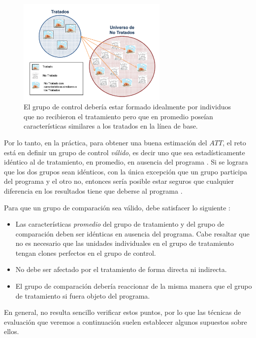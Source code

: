 \documentclass[../../main.tex]{subfiles}
\begin{document}
\begin{figure}[h!]
    \centering
    \includegraphics[width=0.65\textwidth]{figs/grupo-de-control.png}
    \caption{El grupo de control debería estar formado idealmente por individuos que no
    recibieron el tratamiento pero que en promedio poseían características similares a
    los tratados en la línea de base.}
    \label{fig:control-group}
\end{figure}

Por lo tanto, en la práctica, para obtener una buena estimación del \(ATT\), el reto está
en definir un grupo de control \textit{válido}, es decir uno que sea estadísticamente
idéntico al de tratamiento, en promedio, en ausencia del programa \cite{gertler-2016}. Si
se lograra que los dos grupos sean idénticos, con la única excepción que un grupo
participa del programa y el otro no, entonces sería posible estar seguros que cualquier
diferencia en los resultados tiene que deberse al programa \cite{gertler-2016}.

Para que un grupo de comparación sea válido, debe satisfacer lo siguiente \cite{gertler-2016}:
\begin{itemize}
    \item Las características \textit{promedio} del grupo de tratamiento y del grupo de
    comparación deben ser idénticas en ausencia del programa. Cabe resaltar que no es
    necesario que las unidades individuales en el grupo de tratamiento tengan clones
    perfectos en el grupo de control.
    \item No debe ser afectado por el tratamiento de forma directa ni indirecta.
    \item El grupo de comparación debería reaccionar de la misma manera que el grupo de
    tratamiento si fuera objeto del programa.
\end{itemize}
En general, no resulta sencillo verificar estos puntos, por lo que las técnicas de
evaluación que veremos a continuación suelen establecer algunos supuestos sobre ellos.
\end{document}
